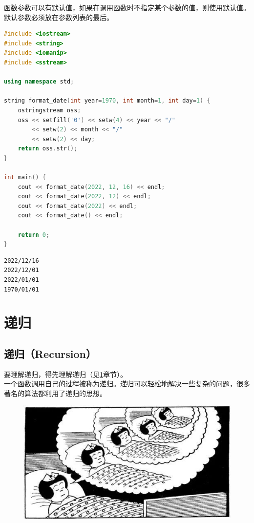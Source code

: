 函数参数可以有默认值，如果在调用函数时不指定某个参数的值，则使用默认值。默认参数必须放在参数列表的最后。\\


\begin{lstlisting}[language=C++]
#include <iostream>
#include <string>
#include <iomanip>
#include <sstream>

using namespace std;

string format_date(int year=1970, int month=1, int day=1) {
	ostringstream oss;
	oss << setfill('0') << setw(4) << year << "/"
		<< setw(2) << month << "/"
		<< setw(2) << day;
	return oss.str();
}

int main() {
	cout << format_date(2022, 12, 16) << endl;
	cout << format_date(2022, 12) << endl;
	cout << format_date(2022) << endl;
	cout << format_date() << endl;

	return 0;
}
\end{lstlisting}

\begin{tcolorbox}
	\begin{verbatim}
2022/12/16
2022/12/01
2022/01/01
1970/01/01
	\end{verbatim}
\end{tcolorbox}

\newpage

\section{递归} \label{recursion}

\subsection{递归（Recursion）}

要理解递归，得先理解递归（见\ref{recursion}章节）。\\

一个函数调用自己的过程被称为递归。递归可以轻松地解决一些复杂的问题，很多著名的算法都利用了递归的思想。

\begin{figure}[H]
	\centering
	\includegraphics[scale=0.7]{img/Chapter5/5-3/1.png}
\end{figure}

